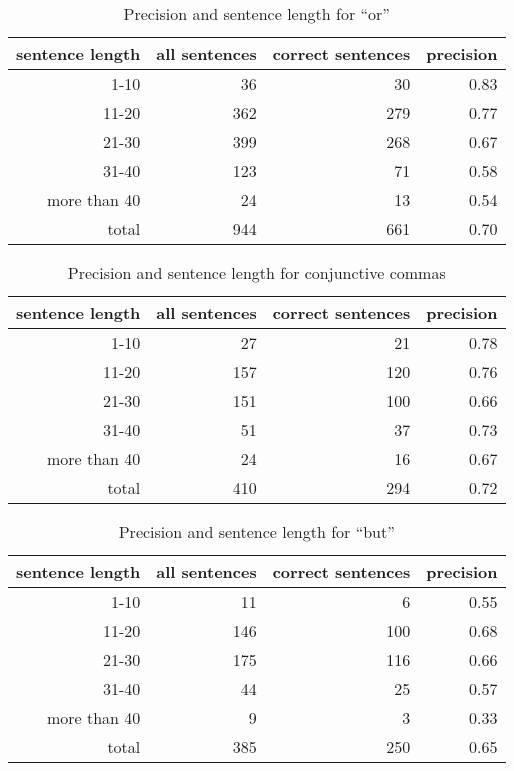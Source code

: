   \begin{table}
    \caption{Precision and sentence length for ``or''}
    \label{ORPREC}
    \begin{center}
      \begin{tabular}{|r|r|r|r|}
        \hline
sentence length & all sentences & correct sentences & precision\\
        \hline
1-10 & 36 & 30 & 0.83 \\
11-20 & 362 & 279 & 0.77 \\
21-30 & 399 & 268 & 0.67 \\
31-40 & 123 & 71 & 0.58 \\
more than 40 & 24 & 13 & 0.54 \\
	\hline
total & 944 & 661 & 0.70 \\
        \hline
      \end{tabular}
    \end{center}
  \end{table}

  \begin{table}
    \caption{Precision and sentence length for conjunctive commas}
    \label{COMMAPREC}
    \begin{center}
      \begin{tabular}{|r|r|r|r|}
        \hline
sentence length & all sentences & correct sentences & precision\\
        \hline
1-10 & 27 & 21 & 0.78 \\
11-20 & 157 & 120 & 0.76 \\
21-30 & 151 & 100 & 0.66 \\
31-40 & 51 & 37 & 0.73 \\
more than 40 & 24 & 16 & 0.67 \\
	\hline
total & 410 & 294 & 0.72 \\
        \hline
      \end{tabular}
    \end{center}
  \end{table}

  \begin{table}
    \caption{Precision and sentence length for ``but''}
    \label{BUTPREC}
    \begin{center}
      \begin{tabular}{|r|r|r|r|}
        \hline
sentence length & all sentences & correct sentences & precision\\
        \hline
1-10 & 11 & 6 & 0.55 \\
11-20 & 146 & 100 & 0.68 \\
21-30 & 175 & 116 & 0.66 \\
31-40 & 44 & 25 & 0.57 \\
more than 40 & 9 & 3 & 0.33 \\
	\hline
total & 385 & 250 & 0.65 \\
        \hline
      \end{tabular}
    \end{center}
  \end{table}

